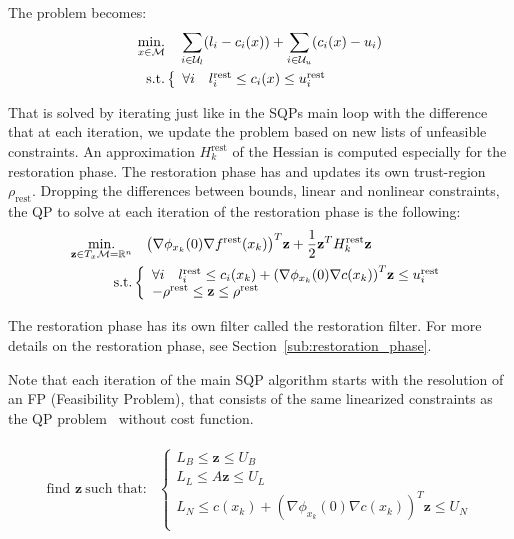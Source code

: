 The problem becomes:
\begin{align}
\label{eq:restoration_problem_simple}
  \operatorname*{min.}_{x \in \mathcal{M}} & \quad \sum_{i\in\mathcal{U}_l} (l_i - c_i(x)) +\sum_{i\in\mathcal{U}_u} (c_i(x) - u_i)\\ \nonumber
  \text{s.t.}&\left\{
  \begin{array}{lr}
    \forall i \quad l^\text{rest}_i \leq c_i(x) \leq u^\text{rest}_i \\
  \end{array}\right.
\end{align}


That is solved by iterating just like in the SQPs main loop with the difference that at each iteration, we update the problem based on new lists of unfeasible constraints.
An approximation $H^\text{rest}_k$ of the Hessian is computed especially for the restoration phase.
The restoration phase has and updates its own trust-region $\rho_\text{rest}$.
Dropping the differences between bounds, linear and nonlinear constraints, the QP to solve at each iteration of the restoration phase is the following:
\begin{align}
  \label{eq:QP_restoration}
  \begin{split}
  \operatorname*{min.}_{\mathbf{z} \in T_x\mathcal{M}=\mathbb{R}^n } & \quad {\left(\nabla\phi_{x_k}(0) \nabla f^\text{rest} (x_k)\right)}^T\mathbf{z} + \frac{1}{2} {\bf z }^T H^\text{rest}_k{\bf z }\\
  \text{s.t.}&\left\{
  \begin{array}{lr}
    \forall i \quad l^\text{rest}_i \leq c_i(x_k) + {\left(\nabla\phi_{x_k}(0) \nabla c (x_k)\right)}^T\mathbf{z} \leq u^\text{rest}_i \\
    -\rho^\text{rest} \leq \mathbf{z} \leq \rho^\text{rest} \\
  \end{array}\right.
  \end{split}
\end{align}


The restoration phase has its own filter called the restoration filter.
For more details on the restoration phase, see Section~\ref{sub:restoration_phase}.

Note that each iteration of the main SQP algorithm starts with the resolution of an FP (Feasibility Problem), that consists of the same linearized constraints as the QP problem~ without cost function.

\begin{align}
  \label{eq:FP_txm}
  \begin{split}
  \text{find } \mathbf{z}\ \text{such that:}&\left\{
  \begin{array}{lr}
    L_B \leq \mathbf{z} \leq U_B \\
    L_L \leq A \mathbf{z} \leq U_L \\
    L_N \leq c(x_k) + {\left(\nabla\phi_{x_k}(0) \nabla c (x_k)\right)}^T\mathbf{z}\leq U_N\\
  \end{array}\right.
  \end{split}
\end{align}

